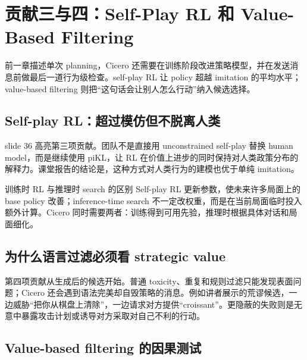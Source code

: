 \section{贡献三与四：Self-Play RL 和 Value-Based Filtering}

前一章描述单次 planning，Cicero 还需要在训练阶段改进策略模型，并在发送消息前做最后一道行为级检查。self-play RL 让 policy 超越 imitation 的平均水平；value-based filtering 则把“这句话会让别人怎么行动”纳入候选选择。

\subsection{Self-play RL：超过模仿但不脱离人类}

slide 36 高亮第三项贡献。团队不是直接用 unconstrained self-play 替换 human model，而是继续使用 piKL，让 RL 在价值上进步的同时保持对人类政策分布的解释力。课堂报告的结论是，这种方式对人类行为的建模也优于单纯 imitation。


\begin{knowledgebox}{训练时 RL 与推理时 search 的区别}
Self-play RL 更新参数，使未来许多局面上的 base policy 改善；inference-time search 不一定改权重，而是在当前局面临时投入额外计算。Cicero 同时需要两者：训练得到可用先验，推理时根据具体对话和局面细化。
\end{knowledgebox}

\subsection{为什么语言过滤必须看 strategic value}

第四项贡献从生成后的候选开始。普通 toxicity、重复和规则过滤只能发现表面问题；Cicero 还会遇到语法完美却自毁策略的消息。例如讲者展示的荒谬候选，一边威胁“把你从棋盘上清除”，一边请求对方提供“croissant”。更隐蔽的失败则是无意中暴露攻击计划或诱导对方采取对自己不利的行动。


\subsection{Value-based filtering 的因果测试}

